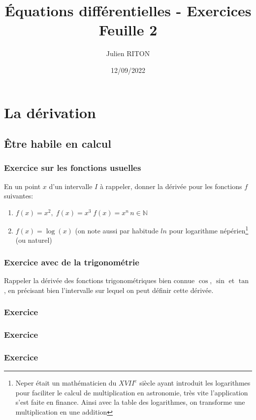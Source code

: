 \documentclass[10pt,a4paper]{article}
\author{Julien RITON}
\title{Équations différentielles - Exercices Feuille 2}
\date{12/09/2022}
\begin{document}
\maketitle

\section{La dérivation}

\subsection{Être habile en calcul}
\subsubsection{Exercice sur les fonctions usuelles}
En un point $x$ d'un intervalle $I$ à rappeler, donner la dérivée pour les fonctions $f$ suivantes:
\begin{enumerate}
\item
$f(x)=x^2,\; f(x)=x^3 \; f(x)=x^n\, n\in\mathbb{N}$
\item
$f(x)=\log(x)$ (on note aussi par habitude $ln$ pour logarithme népérien\footnote{Neper était un mathématicien du $XVII^e$ siècle ayant introduit les logarithmes pour faciliter le calcul de multiplication en astronomie, très vite l'application s'est faite en finance. Ainsi avec la table des logarithmes, on transforme une multiplication en une addition}  (ou naturel)
\end{enumerate} 

\subsubsection{Exercice avec de la trigonométrie}
Rappeler la dérivée des fonctions trigonométriques bien connue $\cos$, $\sin$ et $\tan$, en précisant bien l'intervalle sur lequel on peut définir cette dérivée.



\subsubsection{Exercice}

\subsubsection{Exercice}

\subsubsection{Exercice}
\end{document}
